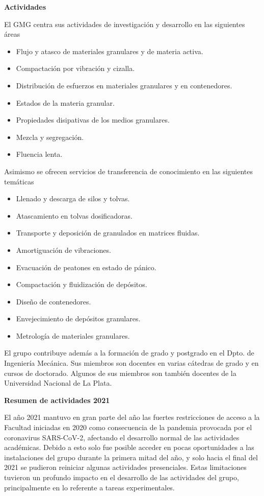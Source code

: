 \documentclass[a4paper,11pt,twoside,final,titlepage,onecolumn,openright]{report}
\begin{document}
\vspace{0.5cm}
{\bf Actividades}
\vspace{0.5cm}

El GMG centra sus actividades de investigación y desarrollo en las siguientes áreas

\begin{itemize}
 \item Flujo y atasco de materiales granulares y de materia activa.
 \item Compactación por vibración y cizalla.
 \item Distribución de esfuerzos en materiales granulares y en contenedores.
 \item Estados de la materia granular.
 \item Propiedades disipativas de los medios granulares.
 \item Mezcla y segregación.
 \item Fluencia lenta.
\end{itemize}

Asimismo se ofrecen servicios de transferencia de conocimiento en las siguientes temáticas

\begin{itemize}
 \item Llenado y descarga de silos y tolvas.
 \item Atascamiento en tolvas dosificadoras.
 \item Transporte y deposición de granulados en matrices fluidas.
 \item Amortiguación de vibraciones.
 \item Evacuación de peatones en estado de pánico.
 \item Compactación y fluidización de depósitos.
 \item Diseño de contenedores.
 \item Envejecimiento de depósitos granulares.
 \item Metrología de materiales granulares.
\end{itemize}

El grupo contribuye además a la formación de grado y postgrado en el Dpto. de Ingeniería Mecánica. Sus miembros son docentes en varias cátedras de grado y en cursos de doctorado. Algunos de sus miembros son también docentes de la Universidad Nacional de La Plata.

\vspace{0.5cm}

{\bf Resumen de actividades 2021}

El año 2021 mantuvo en gran parte del año las fuertes restricciones de acceso a la Facultad iniciadas en 2020 como consecuencia de la pandemia provocada por el coronavirus SARS-CoV-2, afectando el desarrollo normal de las actividades académicas. Debido a esto solo fue posible acceder en pocas oportunidades a las instalaciones del grupo durante la primera mitad del año, y solo hacia el final del 2021 se pudieron reiniciar algunas actividades presenciales. Estas limitaciones tuvieron un profundo impacto en el desarrollo de las actividades del grupo, principalmente en lo referente a tareas experimentales.
\end{document}
